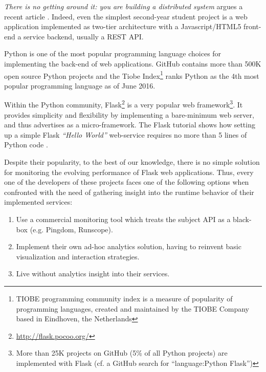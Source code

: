 {\em There is no getting around it: you are building a distributed system} argues a recent article \cite{cavage2013there}. Indeed, even the simplest second-year student project is a web application implemented as two-tier architecture with a Javascript/HTML5 front-end a service backend, usually a REST API.

Python is one of the most popular programming language choices for implementing the back-end of web applications. GitHub contains more than 500K open source Python projects and the Tiobe Index\footnote{TIOBE programming community index is a measure of popularity of programming languages, created and maintained by the TIOBE Company based in Eindhoven, the Netherlands} ranks Python as the 4th most popular programming language as of June 2016.
 
Within the Python community, Flask\footnote{\url{http://flask.pocoo.org/}} is a very popular web framework\footnote{More than 25K projects on GitHub (5\% of all Python projects) are implemented with Flask (cf. a GitHub search for ``language:Python Flask'')}. It provides simplicity and flexibility by implementing a bare-minimum web server, and thus advertises as a micro-framework. The Flask tutorial shows how setting up a simple Flask {\em ``Hello World''} web-service requires no more than 5 lines of Python code \cite{ flask:tutorial}.
 
Despite their popularity, to the best of our knowledge, there is no simple solution for monitoring the evolving performance of Flask web applications. Thus, every one of the developers of these projects faces one of the following options when confronted with the need of gathering insight into the runtime behavior of their implemented services: 

  \begin{enumerate}

    \item Use a commercial monitoring tool which treats the subject API as a black-box (e.g. Pingdom, Runscope). 

    \item Implement their own ad-hoc analytics solution, having to reinvent basic visualization and interaction strategies. 

    \item Live without analytics insight into their services.

  \end{enumerate}


